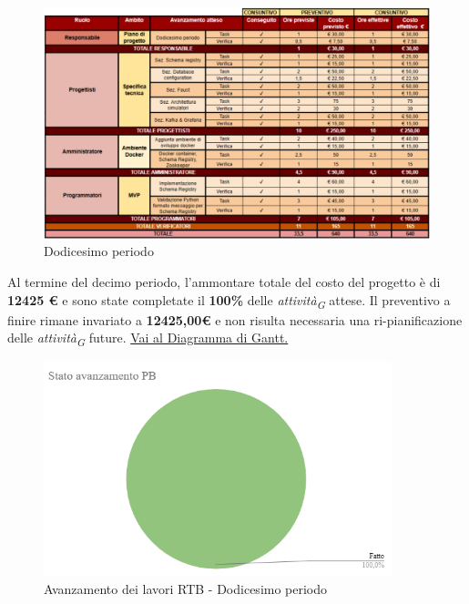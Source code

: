 \vspace{0.4cm}

\begin{figure}[H]
    \centering
    \includegraphics[height=0.6\textwidth]{../Images/periodo12.jpeg}
    \caption{Dodicesimo periodo}
    \label{fig:Dodicesimo_periodo}
\end{figure}

Al termine del decimo periodo, l'ammontare totale del costo del progetto è di \textbf{12425 \euro} e sono state completate il \textbf{100\%} delle \textit{attività}\textsubscript{\textit{G}} attese.
Il preventivo a finire rimane invariato a \textbf{12425,00\euro} e non risulta necessaria una ri-pianificazione delle \textit{attività}\textsubscript{\textit{G}} future.
\href{https://github.com/orgs/ByteOps-swe/projects/3/views/1?sortedBy%5Bdirection%5D=asc&sortedBy%5BcolumnId%5D=64182560}{Vai al Diagramma di Gantt.}

\begin{figure}[H]
    \centering
    \begin{minipage}[b]{0.70\textwidth}
        \centering
        \includegraphics[width=0.9\textwidth]{../Images/avanzamento12Periodo.png}
        \caption{Avanzamento dei lavori RTB - Dodicesimo periodo}
        \label{fig:Avanzamento_RTB_12}
    \end{minipage}
\end{figure}

